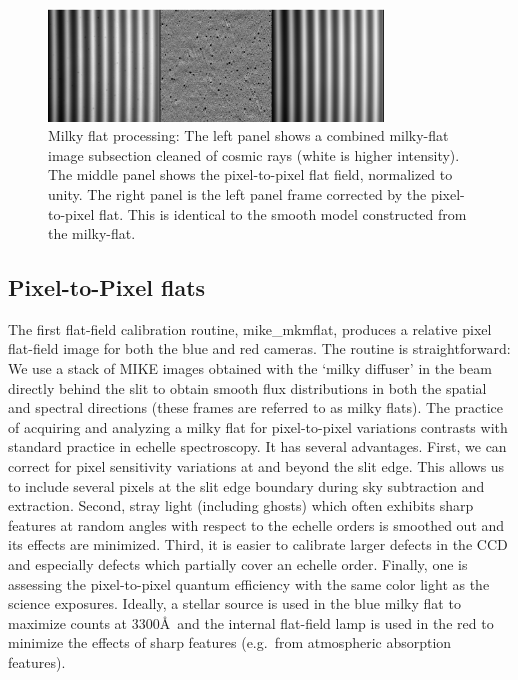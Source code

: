 \documentclass[]{emulateapj}
\begin{document}
\begin{figure}
\includegraphics[width=3.5in]{f2.eps}
\caption{Milky flat processing: The left panel shows a combined milky-flat
image subsection cleaned of cosmic rays (white is higher intensity).  The
middle panel shows the pixel-to-pixel flat field, normalized to unity.  The
right panel is the left panel frame corrected by the pixel-to-pixel flat.
This is identical to the smooth model constructed from the milky-flat. }
\label{fig:mflat}
\end{figure}


\subsection{Pixel-to-Pixel flats}
\label{sec:mflat}

The first flat-field calibration routine, mike\_mkmflat,
produces a relative pixel flat-field image for both the blue 
and red cameras.  The routine is straightforward: We use a stack of
MIKE images obtained with the `milky diffuser' in the beam directly behind
the slit to obtain smooth flux distributions in both the spatial and 
spectral directions (these frames are referred to as milky flats).
The practice of acquiring and analyzing a milky flat for pixel-to-pixel
variations contrasts with standard practice in echelle spectroscopy.
It has several advantages.  First, we can correct for pixel sensitivity
variations at and beyond the slit edge.  This allows us to include
several pixels at the slit edge boundary during sky subtraction
and extraction.  Second, stray light (including ghosts) which often exhibits
sharp features at random angles with respect to the echelle orders
is smoothed out and its effects are minimized.  
Third, it is easier to calibrate larger defects in the CCD and
especially defects which partially cover an echelle order.
Finally, one is assessing the pixel-to-pixel quantum efficiency with
the same color light as the science exposures.
Ideally, a stellar source is used in the blue milky flat to maximize
counts at 3300\AA\
and the internal flat-field lamp is used in the red  
to minimize the effects of sharp features (e.g.\ from atmospheric absorption
features).
\end{document}
